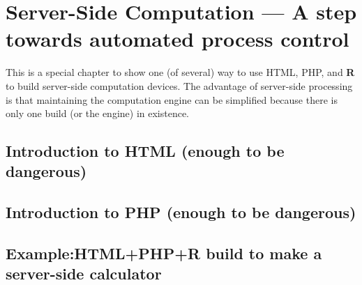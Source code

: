 \section{Server-Side Computation --- A step towards automated process control}
This is a special chapter to show one (of several) way to use HTML, PHP, and \textbf{R} to build server-side computation devices.
The advantage of server-side processing is that maintaining the computation engine can be simplified because there is only one build (or the engine) in existence.
\subsection{Introduction to HTML (enough to be dangerous)}
\subsection{Introduction to PHP (enough to be dangerous)}
\subsection{Example:HTML+PHP+R build to make a server-side calculator} 
